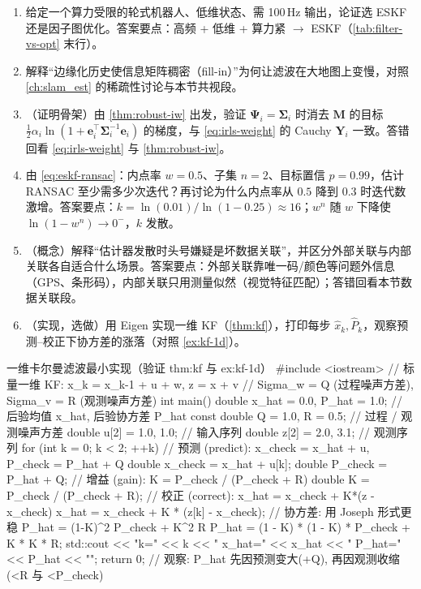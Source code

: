 \begin{practice}
\begin{enumerate}
  \item 给定一个算力受限的轮式机器人、低维状态、需 100\,Hz 输出，论证选 ESKF 还是因子图优化。答案要点：高频 + 低维 + 算力紧 $\to$ ESKF（\cref{tab:filter-vs-opt} 末行）。
  \item 解释“边缘化历史使信息矩阵稠密（fill-in）”为何让滤波在大地图上变慢，对照 \cref{ch:slam_est} 的稀疏性讨论与本节共视段。
  \item （证明骨架）由 \cref{thm:robust-iw} 出发，验证 $\boldsymbol{\Psi}_i=\boldsymbol{\Sigma}_i$ 时消去 $\mathbf{M}$ 的目标 $\tfrac12\alpha_i\ln(1+\mathbf{e}_i^\top\boldsymbol{\Sigma}_i^{-1}\mathbf{e}_i)$ 的梯度，与 \cref{eq:irls-weight} 的 Cauchy $\mathbf{Y}_i$ 一致。答错回看 \cref{eq:irls-weight} 与 \cref{thm:robust-iw}。
  \item 由 \cref{eq:eskf-ransac}：内点率 $w=0.5$、子集 $n=2$、目标置信 $p=0.99$，估计 RANSAC 至少需多少次迭代？再讨论为什么内点率从 $0.5$ 降到 $0.3$ 时迭代数激增。答案要点：$k=\ln(0.01)/\ln(1-0.25)\approx16$；$w^n$ 随 $w$ 下降使 $\ln(1-w^n)\to0^-$，$k$ 发散。
  \item （概念）解释“估计器发散时头号嫌疑是坏数据关联”，并区分外部关联与内部关联各自适合什么场景。答案要点：外部关联靠唯一码/颜色等问题外信息（GPS、条形码），内部关联只用测量似然（视觉特征匹配）；答错回看本节数据关联段。
  \item （实现，选做）用 Eigen 实现一维 KF（\cref{thm:kf}），打印每步 $\hat{x}_k,\hat{P}_k$，观察预测–校正下协方差的涨落（对照 \cref{ex:kf-1d}）。
\end{enumerate}
\end{practice}

\begin{codebox}[C++]{一维卡尔曼滤波最小实现（验证 thm:kf 与 ex:kf-1d）}
#include <iostream>
// 标量一维 KF: x_k = x_{k-1} + u + w,  z = x + v
// Sigma_w = Q (过程噪声方差),  Sigma_v = R (观测噪声方差)
int main() {
  double x_hat = 0.0, P_hat = 1.0;        // 后验均值 x_hat, 后验协方差 P_hat
  const double Q = 1.0, R = 0.5;          // 过程 / 观测噪声方差
  double u[2] = {1.0, 1.0};               // 输入序列
  double z[2] = {2.0, 3.1};               // 观测序列
  for (int k = 0; k < 2; ++k) {
    // 预测 (predict): x_check = x_hat + u,  P_check = P_hat + Q
    double x_check = x_hat + u[k];
    double P_check = P_hat + Q;
    // 增益 (gain): K = P_check / (P_check + R)
    double K = P_check / (P_check + R);
    // 校正 (correct): x_hat = x_check + K*(z - x_check)
    x_hat = x_check + K * (z[k] - x_check);
    // 协方差: 用 Joseph 形式更稳 P_hat = (1-K)^2 P_check + K^2 R
    P_hat = (1 - K) * (1 - K) * P_check + K * K * R;
    std::cout << "k=" << k << " x_hat=" << x_hat << " P_hat=" << P_hat << "\n";
  }
  return 0;   // 观察: P_hat 先因预测变大(+Q), 再因观测收缩(<R 与 <P_check)
}
\end{codebox}

